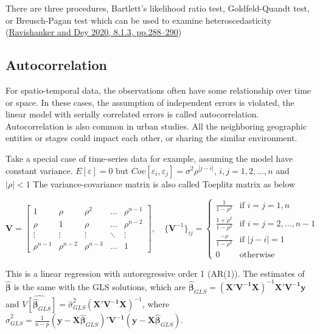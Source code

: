 \documentclass[
  11pt,
  openany]{memoir}
\begin{document}
There are three procedures, Bartlett's likelihood ratio test, Goldfeld-Quandt test, or Breusch-Pagan test which can be used to examine heteroscedasticity (\protect\hyperlink{ref-ravishankerFirstCourseLinear2020}{Ravishanker and Dey 2020, 8.1.3, pp.288--290})

\hypertarget{autocorrelation}{%
\subsection{Autocorrelation}\label{autocorrelation}}

For spatio-temporal data, the observations often have some relationship over time or space.
In these cases, the assumption of independent errors is violated, the linear model with serially correlated errors is called autocorrelation.
Autocorrelation is also common in urban studies. All the neighboring geographic entities or stages could impact each other, or sharing the similar environment.

Take a special case of time-series data for example, assuming the model have constant variance. \(E[\varepsilon]=0\) but \(Cov[\varepsilon_i,\varepsilon_j]=\sigma^2\rho^{|j-i|}\), \(i,j=1,2,...,n\) and \(|\rho|<1\)
The variance-covariance matrix is also called Toeplitz matrix as below

\begin{equation}
\mathbf{V}=\begin{bmatrix} 
1 & \rho & \rho^2 & \dots & \rho^{n-1} \\  
\rho & 1 & \rho & \dots & \rho^{n-2} \\  
\vdots & \vdots & \vdots & \ddots & \vdots \\  
\rho^{n-1} & \rho^{n-2} & \rho^{n-3} & \dots & 1 \end{bmatrix},\quad 
\{\mathbf{V}^{-1}\}_{ij}=\begin{cases} 
\frac{1}{1-\rho^2} & \text{if } i=j=1,n \\  
\frac{1+\rho^2}{1-\rho^2} & \text{if } i=j=2,...,n-1 \\  
\frac{-\rho}{1-\rho^2} & \text{if } |j-i|=1 \\  
0  & \text{otherwise} \end{cases}
\label{eq:auto-matrix}
\end{equation}

This is a linear regression with autoregressive order 1 (AR(1)).
The estimates of \(\boldsymbol{\hat\beta}\) is the same with the GLS solutions, which are
\(\boldsymbol{\hat\beta}_{GLS}=(\mathbf{X'V^{-1}X})^{-1}\mathbf{X'V^{-1}}\mathbf{y}\) and
\(\widehat{V[\boldsymbol{\hat\beta}_{GLS}]}=\hat\sigma^2_{GLS}(\mathbf{X'V^{-1}X})^{-1}\),
where \(\hat\sigma^2_{GLS}=\frac1{n-p}(\mathbf{y-X}\boldsymbol{\hat\beta}_{GLS})'\mathbf{V^{-1}}(\mathbf{y-X}\boldsymbol{\hat\beta}_{GLS})\).
\end{document}

